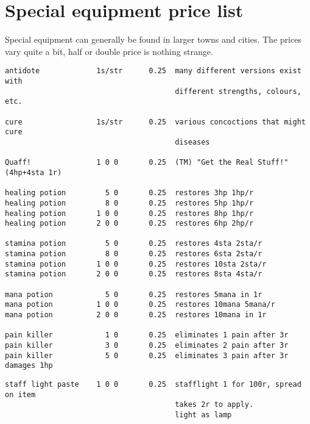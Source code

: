 
\goodbreak
{}
\section*{Special equipment price list}

Special equipment can generally be found in larger towns and cities.
The prices vary quite a bit, half or double price is nothing strange.

\small
\begin{verbatim}
antidote             1s/str      0.25  many different versions exist with
                                       different strengths, colours, etc.

cure                 1s/str      0.25  various concoctions that might cure
                                       diseases

Quaff!               1 0 0       0.25  (TM) "Get the Real Stuff!"  (4hp+4sta 1r)

healing potion         5 0       0.25  restores 3hp 1hp/r
healing potion         8 0       0.25  restores 5hp 1hp/r
healing potion       1 0 0       0.25  restores 8hp 1hp/r
healing potion       2 0 0       0.25  restores 6hp 2hp/r

stamina potion         5 0       0.25  restores 4sta 2sta/r
stamina potion         8 0       0.25  restores 6sta 2sta/r
stamina potion       1 0 0       0.25  restores 10sta 2sta/r
stamina potion       2 0 0       0.25  restores 8sta 4sta/r

mana potion            5 0       0.25  restores 5mana in 1r
mana potion          1 0 0       0.25  restores 10mana 5mana/r
mana potion          2 0 0       0.25  restores 10mana in 1r

pain killer            1 0       0.25  eliminates 1 pain after 3r
pain killer            3 0       0.25  eliminates 2 pain after 3r
pain killer            5 0       0.25  eliminates 3 pain after 3r damages 1hp

\end{verbatim} \goodbreak \begin{verbatim}
staff light paste    1 0 0       0.25  stafflight 1 for 100r, spread on item
                                       takes 2r to apply.
                                       light as lamp


\end{verbatim}
